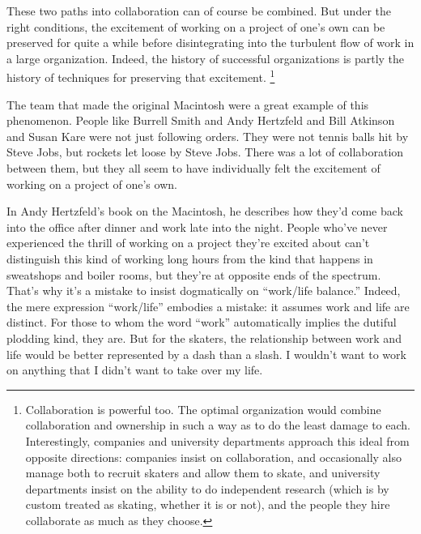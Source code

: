 These two paths into collaboration can of course be combined. But under
the right conditions, the excitement of working on a project of one's
own can be preserved for quite a while before disintegrating into the
turbulent flow of work in a large organization. Indeed, the history of
successful organizations is partly the history of techniques for
preserving that excitement. \footnote{Collaboration is powerful too. The optimal organization would
combine collaboration and ownership in such a way as to do the least
damage to each. Interestingly, companies and university departments
approach this ideal from opposite directions: companies insist on
collaboration, and occasionally also manage both to recruit skaters and
allow them to skate, and university departments insist on the ability to
do independent research (which is by custom treated as skating, whether
it is or not), and the people they hire collaborate as much as they
choose.}

The team that made the original Macintosh were a great example of this
phenomenon. People like Burrell Smith and Andy Hertzfeld and Bill
Atkinson and Susan Kare were not just following orders. They were not
tennis balls hit by Steve Jobs, but rockets let loose by Steve Jobs.
There was a lot of collaboration between them, but they all seem to have
individually felt the excitement of working on a project of one's own.

In Andy Hertzfeld's book on the Macintosh, he describes how they'd come
back into the office after dinner and work late into the night. People
who've never experienced the thrill of working on a project they're
excited about can't distinguish this kind of working long hours from the
kind that happens in sweatshops and boiler rooms, but they're at
opposite ends of the spectrum. That's why it's a mistake to insist
dogmatically on ``work/life balance.'' Indeed, the mere expression
``work/life'' embodies a mistake: it assumes work and life are distinct.
For those to whom the word ``work'' automatically implies the dutiful
plodding kind, they are. But for the skaters, the relationship between
work and life would be better represented by a dash than a slash. I
wouldn't want to work on anything that I didn't want to take over my
life.

